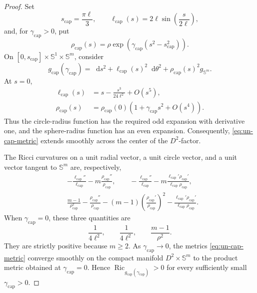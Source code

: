 \documentclass[11pt,reqno]{amsart}
\theoremstyle{definition}
\numberwithin{equation}{section}
\DeclareMathOperator{\Ric}{Ric}
\newcommand{\dd}{\mathop{}\!\mathrm d}
\begin{document}
\begin{proof}
Set
\[
 s_{\mathrm{cap}}=\frac{\pi\ell}{3},
 \qquad
 \ell_{\mathrm{cap}}(s)=2\ell\sin\left(\frac{s}{2\ell}\right),
\]
and, for \(\gamma_{\mathrm{cap}}>0\), put
\[
 \rho_{\mathrm{cap}}(s)
 =\rho\exp\left(\gamma_{\mathrm{cap}}
       (s^2-s_{\mathrm{cap}}^2)\right).
\]
On
\([0,s_{\mathrm{cap}}]\times\mathbb S^1\times\mathbb S^m\), consider
\begin{equation}\label{eq:un-cap-metric}
 g_{\mathrm{cap}}(\gamma_{\mathrm{cap}})
 =\dd s^2+\ell_{\mathrm{cap}}(s)^2\dd\theta^2
       +\rho_{\mathrm{cap}}(s)^2g_{\mathbb S^m}.
\end{equation}
At \(s=0\),
\begin{align*}
 \ell_{\mathrm{cap}}(s)
 &=s-\frac{s^3}{24\ell^2}+O(s^5),\\
 \rho_{\mathrm{cap}}(s)
 &=\rho_{\mathrm{cap}}(0)
   \left(1+\gamma_{\mathrm{cap}}s^2+O(s^4)\right).
\end{align*}
Thus the circle-radius function has the required odd expansion with
derivative one, and the sphere-radius function has an even expansion.
Consequently, \eqref{eq:un-cap-metric} extends smoothly across the
center of the \(D^2\)-factor.

The Ricci curvatures on a unit radial vector, a unit circle vector, and
a unit vector tangent to \(\mathbb S^m\) are, respectively,
\begin{align*}
 &-\frac{\ell_{\mathrm{cap}}''}{\ell_{\mathrm{cap}}}
   -m\frac{\rho_{\mathrm{cap}}''}{\rho_{\mathrm{cap}}},\qquad
 -\frac{\ell_{\mathrm{cap}}''}{\ell_{\mathrm{cap}}}
   -m\frac{\ell_{\mathrm{cap}}'\rho_{\mathrm{cap}}'}
           {\ell_{\mathrm{cap}}\rho_{\mathrm{cap}}},\\
 &\frac{m-1}{\rho_{\mathrm{cap}}^2}
       -\frac{\rho_{\mathrm{cap}}''}{\rho_{\mathrm{cap}}}
       -(m-1)\left(
          \frac{\rho_{\mathrm{cap}}'}{\rho_{\mathrm{cap}}}\right)^2
       -\frac{\ell_{\mathrm{cap}}'\rho_{\mathrm{cap}}'}
              {\ell_{\mathrm{cap}}\rho_{\mathrm{cap}}}.
\end{align*}
When \(\gamma_{\mathrm{cap}}=0\), these three quantities are
\[
 \frac1{4\ell^2},\qquad
 \frac1{4\ell^2},\qquad
 \frac{m-1}{\rho^2}.
\]
They are strictly positive because \(m\ge2\).  As
\(\gamma_{\mathrm{cap}}\to0\), the metrics
\eqref{eq:un-cap-metric} converge smoothly on the compact manifold
\(D^2\times\mathbb S^m\) to the product metric obtained at
\(\gamma_{\mathrm{cap}}=0\).  Hence
\(\Ric_{g_{\mathrm{cap}}(\gamma_{\mathrm{cap}})}>0\) for every
sufficiently small \(\gamma_{\mathrm{cap}}>0\).


\end{proof}
\end{document}
